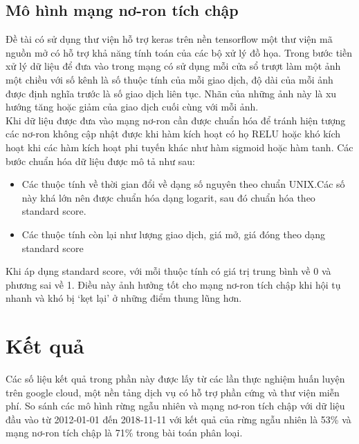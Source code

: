 \subsection{Mô hình mạng nơ-ron tích chập}
 Đề tài có sử dụng thư viện hỗ trợ keras trên nền tensorflow một thư viện mã nguồn mở có hỗ trợ khả năng tính toán của các bộ xử lý đồ họa. Trong bước tiền xử lý dữ liệu để đưa vào trong mạng có sử dụng mỗi cửa sổ trượt làm một ảnh một chiều với số kênh là số thuộc tính của mỗi giao dịch, độ dài của mỗi ảnh được định nghĩa trước là số giao dịch liên tục. Nhãn của những ảnh này là xu hướng tăng hoặc giảm của giao dịch cuối cùng với mỗi ảnh.\\
  Khi dữ liệu được đưa vào mạng nơ-ron cần được chuẩn hóa để tránh hiện tượng các nơ-ron không cập nhật được khi hàm kích hoạt có họ RELU hoặc khó kích hoạt khi các hàm kích hoạt phi tuyến khác như hàm sigmoid hoặc hàm tanh. Các bước chuẩn hóa dữ liệu được mô tả như sau:
 \begin{itemize}
 	\item Các thuộc tính về thời gian đổi về dạng số nguyên theo chuẩn UNIX.Các số này khá lớn nên được chuẩn hóa dạng logarit, sau đó chuẩn hóa theo standard score.
 	\item Các thuộc tính còn lại như lượng giao dịch, giá mở, giá đóng theo dạng standard score
 \end{itemize}
Khi áp dụng standard score, với mỗi thuộc tính có giá trị trung bình về 0 và phương sai về 1. Điều này ảnh hưởng tốt cho mạng nơ-ron tích chập khi hội tụ nhanh và khó bị `kẹt lại'  ở những điểm thung lũng hơn.

 
 \section{Kết quả}
 Các số liệu kết quả trong phần này được lấy từ các lần thực nghiệm huấn luyện trên google cloud, một nền tảng dịch vụ có hỗ trợ phần cứng và thư viện miễn phí. So sánh các mô hình rừng ngẫu nhiên và mạng nơ-ron tích chập với dữ liệu đầu vào từ  2012-01-01 đến 2018-11-11 với kết quả của rừng ngẫu nhiên là 53\% và mạng nơ-ron tích chập là 71\% trong bài toán phân loại.
 
 